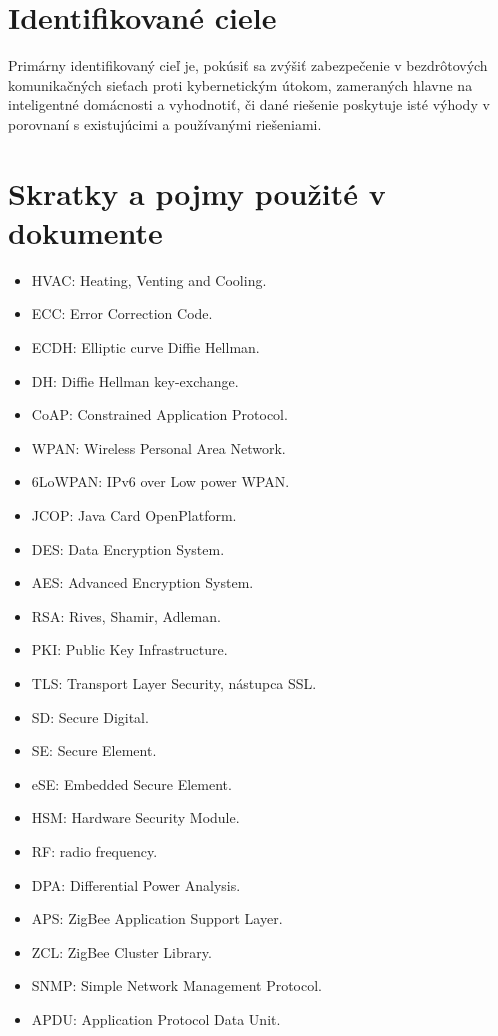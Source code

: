 \documentclass[12pt,a4paper,oneside,openright]{report}
\begin{document}
\section{Identifikované ciele}
Primárny identifikovaný cieľ je, pokúsiť sa zvýšiť zabezpečenie v bezdrôtových komunikačných sieťach proti kybernetickým útokom, zameraných hlavne na inteligentné domácnosti a vyhodnotiť, či dané riešenie poskytuje isté výhody v porovnaní s existujúcimi a používanými riešeniami.

\newpage
\singlespacing
\section{Skratky a pojmy použité v dokumente}
\begin{itemize}
	\item HVAC: Heating, Venting and Cooling.
	\item ECC: Error Correction Code.
	\item ECDH: Elliptic curve Diffie Hellman.
	\item DH: Diffie Hellman key-exchange.
	\item CoAP: Constrained Application Protocol.
	\item WPAN: Wireless Personal Area Network.
	\item 6LoWPAN: IPv6 over Low power WPAN.
	\item JCOP: Java Card OpenPlatform.
	\item DES: Data Encryption System.
	\item AES: Advanced Encryption System.
	\item RSA: Rives, Shamir, Adleman.
	\item PKI: Public Key Infrastructure.
	\item TLS: Transport Layer Security, nástupca SSL.
	\item SD: Secure Digital.
	\item SE: Secure Element.
	\item eSE: Embedded Secure Element.
	\item HSM: Hardware Security Module.
	\item RF: radio frequency.
	\item DPA: Differential Power Analysis.
	\item APS: ZigBee Application Support Layer.
	\item ZCL: ZigBee Cluster Library.
	\item SNMP: Simple Network Management Protocol.
	\item APDU: Application Protocol Data Unit.

\end{itemize}
\end{document}

